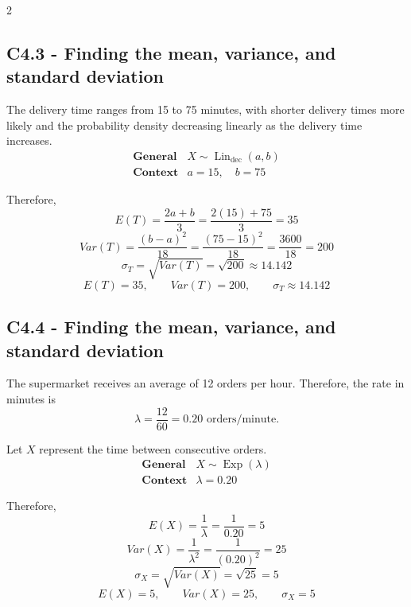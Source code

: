 \begin{multicols}{2}
	
	\subsection*{C4.3 - Finding the mean, variance, and standard deviation}
	\label{subsec:c4-solution-delivery-time}
	
	The delivery time ranges from 15 to 75 minutes, with shorter delivery
	times more likely and the probability density decreasing linearly as
	the delivery time increases.
	\[
	\begin{array}{c|c}
		\textbf{General}
		&
		X\sim\operatorname{Lin}_{\mathrm{dec}}(a,b)
		\\[6pt]
		\textbf{Context}
		&
		a=15,\quad b=75
	\end{array}
	\]
	
	Therefore,
	\[
	E(T)
	=
	\frac{2a+b}{3}
	=
	\frac{2(15)+75}{3}
	=
	35
	\]
	\[
	Var(T)
	=
	\frac{(b-a)^2}{18}
	=
	\frac{(75-15)^2}{18}
	=
	\frac{3600}{18}
	=
	200
	\]
	\[
	\sigma_T
	=
	\sqrt{Var(T)}
	=
	\sqrt{200}
	\approx14.142
	\]
	\[
	\boxed{
		E(T)=35,\qquad
		Var(T)=200,\qquad
		\sigma_T\approx14.142
	}
	\]
	
	
	\subsection*{C4.4 - Finding the mean, variance, and standard deviation}
	\label{subsec:c4-solution-online-orders}
	
	The supermarket receives an average of 12 orders per hour. Therefore,
	the rate in minutes is
	\[
	\lambda
	=
	\frac{12}{60}
	=
	0.20\text{ orders/minute}.
	\]
	
	Let $X$ represent the time between consecutive orders.
	\[
	\begin{array}{c|c}
		\textbf{General}
		&
		X\sim\operatorname{Exp}(\lambda)
		\\[6pt]
		\textbf{Context}
		&
		\lambda=0.20
	\end{array}
	\]
	
	Therefore,
	\[
	E(X)
	=
	\frac{1}{\lambda}
	=
	\frac{1}{0.20}
	=
	5
	\]
	\[
	Var(X)
	=
	\frac{1}{\lambda^2}
	=
	\frac{1}{(0.20)^2}
	=
	25
	\]
	\[
	\sigma_X
	=
	\sqrt{Var(X)}
	=
	\sqrt{25}
	=
	5
	\]	
	\[
	\boxed{
		E(X)=5,\qquad
		Var(X)=25,\qquad
		\sigma_X=5
	}
	\]
	

\end{multicols}
